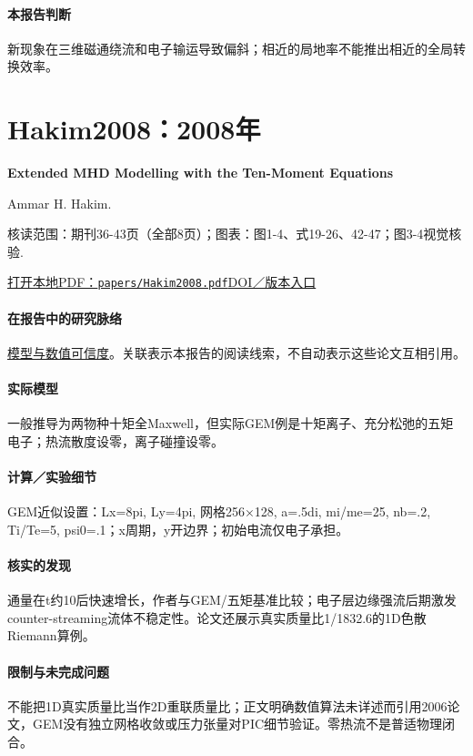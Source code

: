 \paragraph{本报告判断}新现象在三维磁通绕流和电子输运导致偏斜；相近的局地率不能推出相近的全局转换效率。

\section{Hakim2008：2008年}\label{paper:Hakim2008}

\textbf{Extended MHD Modelling with the Ten-Moment Equations}\citep{Hakim2008}\

Ammar H. Hakim.

\textsf{核读范围：}期刊36-43页（全部8页）；\textsf{图表：}图1-4、式19-26、42-47；图3-4视觉核验.

\href{run:papers/Hakim2008.pdf}{打开本地PDF：\texttt{papers/Hakim2008.pdf}}\quad\href{https://doi.org/10.1007/s10894-007-9116-z}{DOI／版本入口}

\paragraph{在报告中的研究脉络}\hyperref[ch:numerics]{模型与数值可信度}。关联表示本报告的阅读线索，不自动表示这些论文互相引用。

\paragraph{实际模型}一般推导为两物种十矩全Maxwell，但实际GEM例是十矩离子、充分松弛的五矩电子；热流散度设零，离子碰撞设零。

\paragraph{计算／实验细节}GEM近似设置：Lx=8pi, Ly=4pi, 网格256×128, a=.5di, mi/me=25, nb=.2, Ti/Te=5, psi0=.1；x周期，y开边界；初始电流仅电子承担。

\paragraph{核实的发现}通量在t约10后快速增长，作者与GEM/五矩基准比较；电子层边缘强流后期激发counter-streaming流体不稳定性。论文还展示真实质量比1/1832.6的1D色散Riemann算例。

\paragraph{限制与未完成问题}不能把1D真实质量比当作2D重联质量比；正文明确数值算法未详述而引用2006论文，GEM没有独立网格收敛或压力张量对PIC细节验证。零热流不是普适物理闭合。

